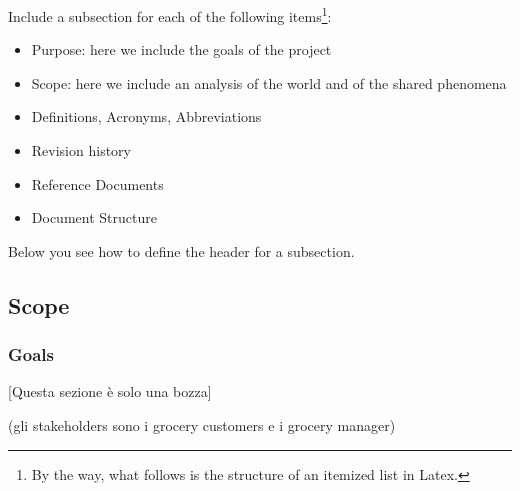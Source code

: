 Include a subsection for each of the following items\footnote{By the way, what follows is the structure of an itemized list in Latex.}:
\begin{itemize}
\item
Purpose: here we include the goals of the project
\item
Scope: here we include an analysis of the world and of the shared phenomena
\item
Definitions, Acronyms, Abbreviations
\item
Revision history
\item
Reference Documents 
\item
Document Structure
\end{itemize}
Below you see how to define the header for a subsection.
\subsection{Scope}
\subsubsection{Goals}
[Questa sezione è solo una bozza]

(gli stakeholders sono i grocery customers e i grocery manager)


